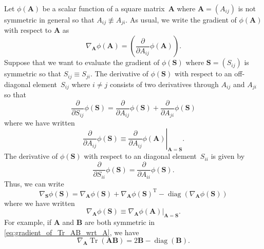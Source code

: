 \documentclass[12pt,a4paper]{article}
\begin{document}
Let $\phi(\mathbf{A})$ be a scalar function of a square matrix~$\mathbf{A}$
where $\mathbf{A} = \left(A_{ij}\right)$ is not symmetric in general so that
$A_{ij} \not\equiv A_{ji}$.
As usual, we write the gradient of $\phi(\mathbf{A})$ with respect to $\mathbf{A}$ as
\begin{equation}
\nabla_{\mathbf{A}} \phi(\mathbf{A})
= \left( \frac{\partial}{\partial A_{ij}} \phi(\mathbf{A}) \right) .
\end{equation}
Suppose that we want to evaluate the gradient of $\phi(\mathbf{S})$ where
$\mathbf{S} = \left(S_{ij}\right)$ is symmetric so that $S_{ij} \equiv S_{ji}$.
The derivative of $\phi(\mathbf{S})$ with respect to
an off-diagonal element~$S_{ij}$ where $i \neq j$
consists of two derivatives through $A_{ij}$ and $A_{ji}$ so that
\begin{equation}
\frac{\partial}{\partial S_{ij}} \phi(\mathbf{S})
= \frac{\partial}{\partial A_{ij}} \phi(\mathbf{S})
+ \frac{\partial}{\partial A_{ji}} \phi(\mathbf{S})
\label{eq:derivative_of_scalar_wrt_S_ij}
\end{equation}
where we have written
\begin{equation}
\frac{\partial}{\partial A_{ij}} \phi(\mathbf{S})
\equiv \left.
\frac{\partial}{\partial A_{ij}} \phi(\mathbf{A}) \right|_{\mathbf{A} = \mathbf{S}} .
\end{equation}
The derivative of $\phi(\mathbf{S})$ with respect to an diagonal element~$S_{ii}$ is given by
\begin{equation}
\frac{\partial}{\partial S_{ii}} \phi(\mathbf{S})
= \frac{\partial}{\partial A_{ii}} \phi(\mathbf{S}) .
\label{eq:derivative_of_scalar_wrt_S_ii}
\end{equation}
Thus, we can write
\begin{equation}
\nabla_{\mathbf{S}} \phi(\mathbf{S})
= \nabla_{\mathbf{A}} \phi(\mathbf{S})
+ \nabla_{\mathbf{A}} \phi(\mathbf{S})^{\operatorname{T}}
- \operatorname{diag}\left( \nabla_{\mathbf{A}} \phi(\mathbf{S}) \right)
\label{eq:gradient_of_scalar_wrt_symmetric_matrix}
\end{equation}
where we have written
\begin{equation}
\nabla_{\mathbf{A}} \phi(\mathbf{S})
\equiv \left.
\nabla_{\mathbf{A}} \phi(\mathbf{A})
\right|_{\mathbf{A} = \mathbf{S}} .
\end{equation}
For example, if $\mathbf{A}$ and $\mathbf{B}$ are both symmetric in
\eqref{eq:gradient_of_Tr_AB_wrt_A}, we have
\begin{equation}
\nabla_{\mathbf{A}} \operatorname{Tr}\left(\mathbf{A}\mathbf{B}\right)
= 2\mathbf{B} - \operatorname{diag}(\mathbf{B}) .
\end{equation}
\end{document}
